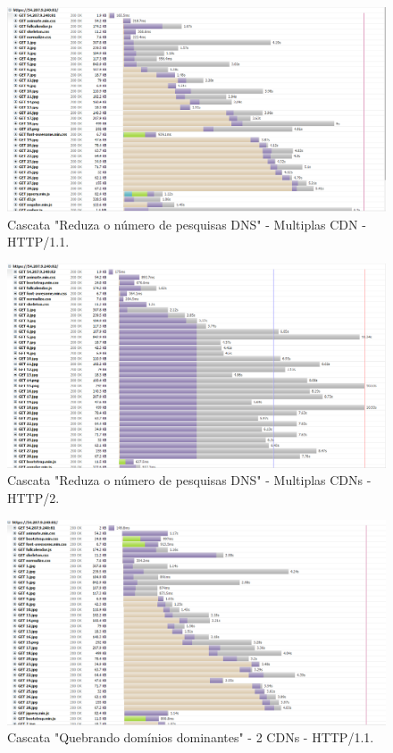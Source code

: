 \begin{figure}[!htb]
    \centering
    \caption{Cascata "Reduza o número de pesquisas DNS" - Multiplas CDN - HTTP/1.1.}
    \includegraphics[width=1.0\textwidth]{./04-figuras/cascatas/multiple_http11}
\end{figure}

\begin{figure}[!htb]
    \centering
    \caption{Cascata "Reduza o número de pesquisas DNS" - Multiplas CDNs - HTTP/2.}
    \includegraphics[width=1.0\textwidth]{./04-figuras/cascatas/multiple_http2}
\end{figure}

\begin{figure}[!htb]
    \centering
    \caption{Cascata "Quebrando domínios dominantes" - 2 CDNs - HTTP/1.1.}
    \includegraphics[width=1.0\textwidth]{./04-figuras/cascatas/2cds_http11}
\end{figure}

